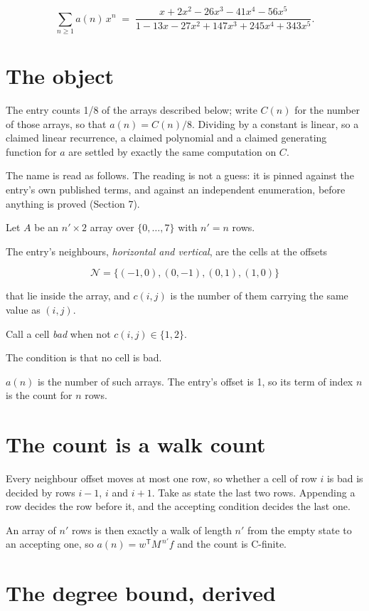 \documentclass[11pt]{article}
\theoremstyle{definition}
\begin{document}
\[\sum_{n \ge 1} a(n)\,x^n \;=\; \frac{x + 2x^{2} - 26x^{3} - 41x^{4} - 56x^{5}}{1 - 13x - 27x^{2} + 147x^{3} + 245x^{4} + 343x^{5}}.\]

\section{The object}

The entry counts 1/8 of the arrays described below; write $C(n)$ for the number of those arrays, so that $a(n) = C(n)/8$. Dividing by a constant is linear, so a claimed linear recurrence, a claimed polynomial and a claimed generating function for $a$ are settled by exactly the same computation on $C$.

The name is read as follows. The reading is not a guess: it is pinned against the entry's own published terms, and against an independent enumeration, before anything is proved (Section 7).

Let $A$ be an $n' \times 2$ array over $\{0,\dots,7\}$ with $n' = n$ rows.

The entry's neighbours, {\itshape horizontal and vertical}, are the cells at the offsets

\[\mathcal{N} = \{(-1,0), (0,-1), (0,1), (1,0)\}\]

that lie inside the array, and $c(i,j)$ is the number of them carrying the same value as $(i,j)$.

Call a cell {\itshape bad} when not $c(i,j) \in \{1, 2\}$.

The condition is that no cell is bad.

$a(n)$ is the number of such arrays. The entry's offset is 1, so its term of index $n$ is the count for $n$ rows.

\section{The count is a walk count}

Every neighbour offset moves at most one row, so whether a cell of row $i$ is bad is decided by rows $i-1$, $i$ and $i+1$. Take as state the last two rows. Appending a row decides the row before it, and the accepting condition decides the last one.

An array of $n'$ rows is then exactly a walk of length $n'$ from the empty state to an accepting one, so $a(n) = w^{\mathsf T}M^{\,n'}f$ and the count is C-finite.

\section{The degree bound, derived}
\end{document}

